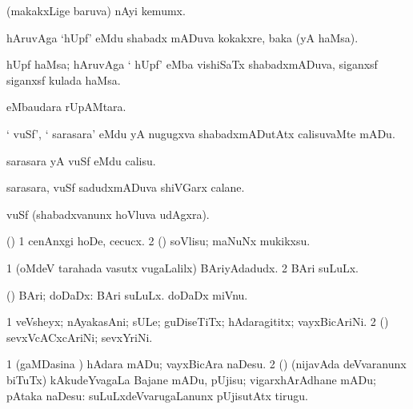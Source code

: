 \bentry
{}
\gl{\nA}
\bmng
(makakxLige baruva) nAyi kemumx. 
\emng
\eentry

\bentry
{}
\gl{\nA}
\bmng
hAruvAga `hUpf' eMdu shabadx mADuva kokakxre, baka (yA haMsa). 
\emng
\eentry

\bentry
{}
\gl{\nA}
\bmng
hUpf haMsa; hAruvAga ` hUpf' eMba vishiSaTx shabadxmADuva, siganxsf siganxsf kulada haMsa. 
\emng
\eentry

\bentry
{}
\gl{\BAavayx}
\bmng
{} eMbaudara rUpAMtara. 
\emng
\eentry

\bentry
{} 
\gl{\sakirx}
\expl{}
\bmng
` vuSf', ` sarasara' eMdu yA nugugxva shabadxmADutAtx calisuvaMte mADu. 
\emng

\noindent
\gl{\akirx}
\bmng
sarasara yA vuSf eMdu calisu. 
\emng
\eentry

\bentry
{} 
\gl{\nA}
\bmng
sarasara, vuSf sadudxmADuva shiVGarx calane. 
\emng
\eentry

\bentry
{} 
\gl{\BAavayx}
\bmng
vuSf (shabadxvanunx hoVluva udAgxra). 
\emng
\eentry

\bentry
{} 
\gl{\sakirx}
\bmng
(\ashi) 
\bnum
\num{1} cenAnxgi hoDe, cecucx. 
\num{2} (\rUpa) soVlisu; maNuNx mukikxsu. 
\enum
\emng
\eentry

\bentry 
{}
\gl{\nA}
\bmng
\bnum
\num{1} (oMdeV tarahada vasutx \mo vugaLalilx) BAriyAdadudx. 
\num{2} BAri suLuLx. 
\enum
\emng
\eentry

\bentry
{}
\gl{\gu}
\bmng
(\ashi) BAri; doDaDx:  BAri suLuLx.  doDaDx miVnu. 
\emng
\eentry

\bentry
{} 
\gl{\nA}
\bmng
\bnum
\num{1} veVsheyx; nAyakasAni; sULe; guDiseTiTx; hAdaragititx; vayxBicAriNi. 
\num{2} (\hiV) sevxVcACxcAriNi; sevxYriNi. 
\enum
\emng
\eentry

\bentry
{} 
\gl{\akirx}
\bmng
\bnum
\num{1} (gaMDasina \vi) hAdara mADu; vayxBicAra naDesu. 
\num{2} (\pArxparx) (nijavAda deVvaranunx biTuTx) kAkudeYvagaLa Bajane mADu, pUjisu; vigarxhArAdhane mADu; pAtaka naDesu:  suLuLxdeVvarugaLanunx pUjisutAtx tirugu. 
\enum
\emng
\eentry

